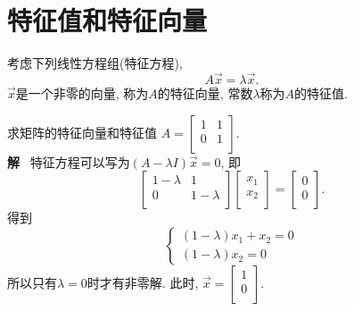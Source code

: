 
\section{特征值和特征向量}
考虑下列线性方程组(特征方程),
\begin{equation}
  A\vec{x}=\lambda \vec{x}.
\end{equation}
$\vec{x}$是一个非零的向量, 称为$A$的特征向量, 常数$\lambda$称为$A$的特征值.

\begin{example}
    求矩阵的特征向量和特征值
    $A = \begin{bmatrix}
     1 & 1\\
     0 & 1\\
    \end{bmatrix}$.
    \\
    \textbf{解}
    \ 
    特征方程可以写为$\left( A - \lambda I \right) \vec{x} = 0$, 即
    \begin{equation}
      \begin{bmatrix}
       1-\lambda & 1\\
       0 & 1-\lambda\\
      \end{bmatrix} \begin{bmatrix}
       x_1\\
       x_2\\
      \end{bmatrix} = \begin{bmatrix}
       0\\
       0\\
      \end{bmatrix}.
    \end{equation}
    得到
    \begin{equation}
      \begin{cases}
        \left( 1 - \lambda \right) x_1 + x_2 = 0
        \\
        \left( 1-\lambda \right) x_2 = 0
      \end{cases}
    \end{equation}
    所以只有$\lambda = 0$时才有非零解.
    此时, $\vec{x} = \begin{bmatrix}
     1\\
     0\\
    \end{bmatrix}$.
\end{example}

